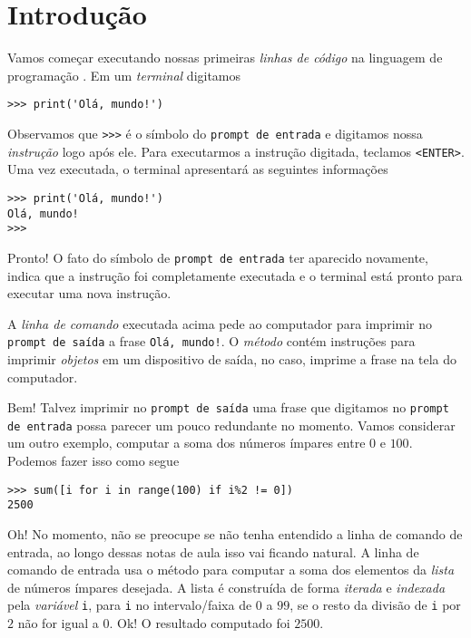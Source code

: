\chapter{Introdução}\label{cap_intro}

Vamos começar executando nossas primeiras \emph{linhas de código} na linguagem de programação {\python}. Em um \emph{terminal} {\python} digitamos

\begin{lstlisting}
>>> print('Olá, mundo!')
\end{lstlisting}

Observamos que \lstinline+>>>+ é o símbolo do \lstinline+prompt de entrada+ e digitamos nossa \emph{instrução} logo após ele. Para executarmos a instrução digitada, teclamos \lstinline+<ENTER>+. Uma vez executada, o terminal apresentará as seguintes informações

\begin{lstlisting}
>>> print('Olá, mundo!')
Olá, mundo!
>>> 
\end{lstlisting}

Pronto! O fato do símbolo de \lstinline+prompt de entrada+ ter aparecido novamente, indica que a instrução foi completamente executada e o terminal está pronto para executar uma nova instrução.

A \emph{linha de comando} executada acima pede ao computador para imprimir no \lstinline+prompt de saída+ a frase \lstinline+Olá, mundo!+. O \emph{método} {\PYTHONprint} contém instruções para imprimir \emph{objetos} em um dispositivo de saída, no caso, imprime a frase na tela do computador.

Bem! Talvez imprimir no \lstinline+prompt de saída+ uma frase que digitamos no \lstinline+prompt de entrada+ possa parecer um pouco redundante no momento. Vamos considerar um outro exemplo, computar a soma dos números ímpares entre $0$ e $100$. Podemos fazer isso como segue

\begin{lstlisting}
>>> sum([i for i in range(100) if i%2 != 0])
2500
\end{lstlisting}

Oh! No momento, não se preocupe se não tenha entendido a linha de comando de entrada, ao longo dessas notas de aula isso vai ficando natural. A linha de comando de entrada usa o método {\PYTHONsum} para computar a soma dos elementos da \emph{lista} de números ímpares desejada. A lista é construída de forma \emph{iterada} e \emph{indexada} pela \emph{variável} \lstinline+i+, para \lstinline+i+ no intervalo/faixa de $0$ a $99$, se o resto da divisão de \lstinline+i+ por $2$ não for igual a $0$. Ok! O resultado computado foi $2500$.

